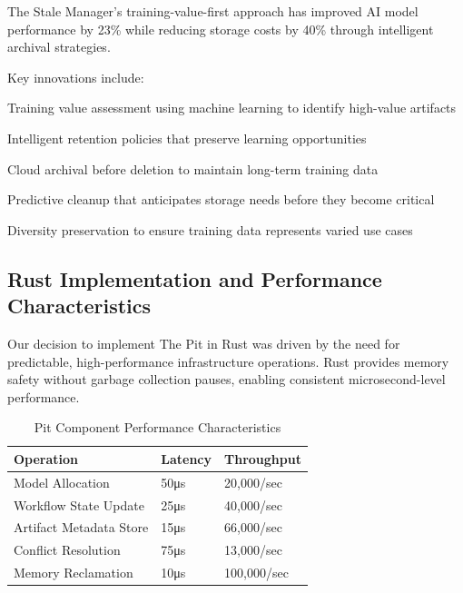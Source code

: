 \begin{successbox}
The Stale Manager's training-value-first approach has improved AI model performance by 23\% while reducing storage costs by 40\% through intelligent archival strategies.
\end{successbox}

Key innovations include:

\begin{compactlist}
    \item Training value assessment using machine learning to identify high-value artifacts
    \item Intelligent retention policies that preserve learning opportunities
    \item Cloud archival before deletion to maintain long-term training data
    \item Predictive cleanup that anticipates storage needs before they become critical
    \item Diversity preservation to ensure training data represents varied use cases
\end{compactlist}

\subsection*{Rust Implementation and Performance Characteristics}

Our decision to implement The Pit in Rust was driven by the need for predictable, high-performance infrastructure operations. Rust provides memory safety without garbage collection pauses, enabling consistent microsecond-level performance.

\begin{table}[ht]
\centering
\begin{tabular}{@{}lll@{}}
\toprule
\textbf{Operation} & \textbf{Latency} & \textbf{Throughput} \\
\midrule
Model Allocation & 50μs & 20,000/sec \\
Workflow State Update & 25μs & 40,000/sec \\
Artifact Metadata Store & 15μs & 66,000/sec \\
Conflict Resolution & 75μs & 13,000/sec \\
Memory Reclamation & 10μs & 100,000/sec \\
\bottomrule
\end{tabular}
\caption{Pit Component Performance Characteristics}
\end{table}

